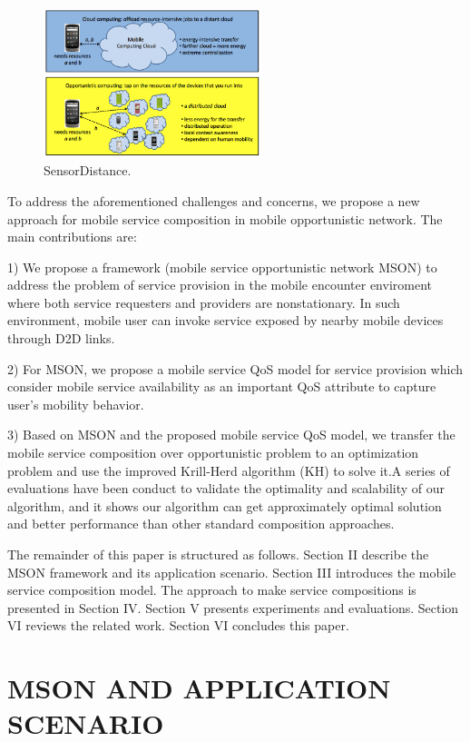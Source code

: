\documentclass[10pt,journal,compsoc]{IEEEtran}
\begin{document}
\begin{figure}[!t]
\centering
\includegraphics[width=2.5in]{./img/fig1.png}
\caption{SensorDistance.}
\label{fig_sim}
\end{figure}

To address the aforementioned challenges and concerns, we propose a new approach for mobile service composition in mobile opportunistic network. The main contributions are:

1) We propose a framework (mobile service opportunistic network MSON) to address the problem of service provision in the mobile encounter enviroment where both service requesters and providers are nonstationary. In such environment, mobile user can invoke service exposed by nearby mobile devices through D2D links.

2) For MSON, we propose a mobile service QoS model for service provision which consider mobile service availability as an important QoS attribute to capture user's mobility behavior.

3) Based on MSON and the proposed mobile service QoS model, we transfer the mobile service composition over opportunistic problem to an optimization problem and use the improved Krill-Herd algorithm (KH) to solve it.A series of evaluations have been conduct to validate the optimality and scalability of our algorithm, and it shows our algorithm can get approximately optimal solution and better performance than other standard composition approaches. 

The remainder of this paper is structured as follows. Section II describe the MSON framework and its application scenario. Section III introduces the mobile service composition model. The approach to make service compositions is presented in Section IV. Section V presents experiments and evaluations. Section VI reviews the related work. Section VI concludes this paper.

\section{MSON AND APPLICATION SCENARIO}
\end{document}
